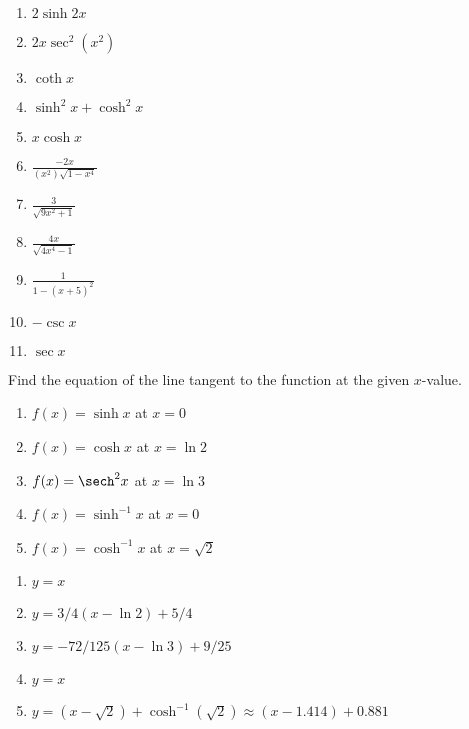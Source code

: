 \begin{enumialphparenastyle}
\begin{ex}
\begin{enumerate}
\end{enumerate}
	\begin{sol}
	\begin{enumerate}
	\item {$2\sinh 2x$}
	\item {$2x\sec^2(x^2)$}
	\item {$\coth x$}
	\item {$\sinh^2x+\cosh^2x$}
	\item {$x\cosh x$}
	\item {$\frac{-2x}{(x^2)\sqrt{1-x^4}}$}
	\item {$\frac{3}{\sqrt{9x^2+1}}$}
	\item {$\frac{4x}{\sqrt{4x^4-1}}$}
	\item {$\frac{1}{1-(x+5)^2}$}
	\item {$-\csc x$}
	\item {$\sec x$}
	\end{enumerate}
	\end{sol}
\end{ex}


\begin{ex}
Find the equation of the line tangent to the function at the given $x$-value.
\begin{enumerate}
\item {$f(x) = \sinh x$ at $x=0$}

\item {$f(x) = \cosh x$ at $x=\ln 2$}

\item {$f(x) = \sech^2 x$ at $x=\ln 3$}

\item {$f(x) = \sinh^{-1} x$ at $x=0$}

\item {$f(x) = \cosh^{-1} x$ at $x=\sqrt 2$}

\end{enumerate}
	\begin{sol}
	\begin{enumerate}
	\item {$y=x$}
	\item {$y=3/4(x-\ln 2)+5/4$}
	\item {$y=-72/125(x-\ln 3)+9/25$}
	\item {$y=x$}
	\item  {$y=(x-\sqrt{2})+\cosh^{-1}(\sqrt{2}) \approx (x-1.414)+0.881$}
	\end{enumerate}
	\end{sol}
\end{ex}



\end{enumialphparenastyle}

